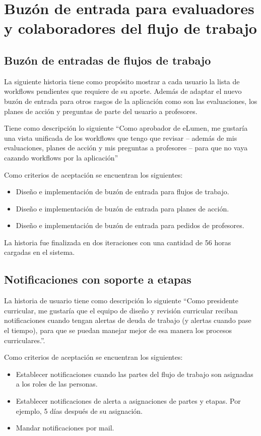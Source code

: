\section{Buzón de entrada para evaluadores y colaboradores del flujo de trabajo}
\subsection{Buzón de entradas de flujos de trabajo}
La siguiente historia tiene como propósito mostrar a cada usuario la lista de workflows pendientes que requiere de su aporte. Además de adaptar el nuevo buzón de entrada para otros rasgos de la aplicación como son las evaluaciones, los planes de acción y preguntas de parte del usuario a profesores.

Tiene como descripción lo siguiente \enquote{Como aprobador de eLumen, me gustaría una vista unificada de los workflows que tengo que revisar – además de mis evaluaciones, planes de acción y mis preguntas a profesores – para que no vaya cazando workflows por la aplicación}

Como criterios de aceptación se encuentran los siguientes:
\begin{itemize}
	\item Diseño e implementación de buzón de entrada para flujos de trabajo.
	\item Diseño e implementación de buzón de entrada para planes de acción.
	\item Diseño e implementación de buzón de entrada para pedidos de profesores.
\end{itemize}

La historia fue finalizada en dos iteraciones con una cantidad de 56 horas cargadas en el sistema.

\subsection{Notificaciones con soporte a etapas}
La historia de usuario tiene como descripción lo siguiente \enquote{Como presidente curricular, me gustaría que el equipo de diseño y revisión curricular reciban notificaciones cuando tengan alertas de deuda de trabajo (y alertas cuando pase el tiempo), para que se puedan manejar mejor de esa manera los procesos curriculares.}.

Como criterios de aceptación se encuentran los siguientes:
\begin{itemize}
	\item Establecer notificaciones cuando las partes del flujo de trabajo son asignadas a los roles de las personas.
	\item Establecer notificaciones de alerta a asignaciones de partes y etapas. Por ejemplo, 5 días después de su asignación.
	\item Mandar notificaciones por mail.
\end{itemize}

